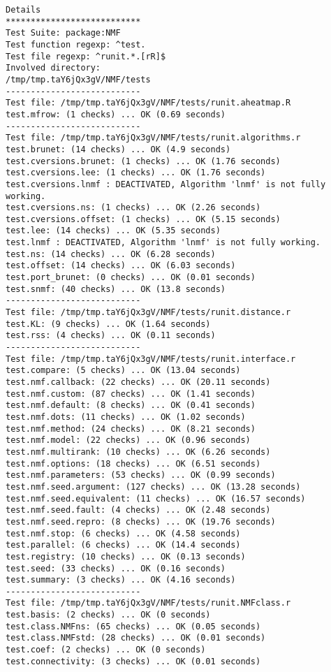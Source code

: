 \documentclass[10pt]{article}
\begin{document}
\begin{verbatim}
Details 
*************************** 
Test Suite: package:NMF 
Test function regexp: ^test. 
Test file regexp: ^runit.*.[rR]$ 
Involved directory: 
/tmp/tmp.taY6jQx3gV/NMF/tests 
--------------------------- 
Test file: /tmp/tmp.taY6jQx3gV/NMF/tests/runit.aheatmap.R 
test.mfrow: (1 checks) ... OK (0.69 seconds)
--------------------------- 
Test file: /tmp/tmp.taY6jQx3gV/NMF/tests/runit.algorithms.r 
test.brunet: (14 checks) ... OK (4.9 seconds)
test.cversions.brunet: (1 checks) ... OK (1.76 seconds)
test.cversions.lee: (1 checks) ... OK (1.76 seconds)
test.cversions.lnmf : DEACTIVATED, Algorithm 'lnmf' is not fully working.
test.cversions.ns: (1 checks) ... OK (2.26 seconds)
test.cversions.offset: (1 checks) ... OK (5.15 seconds)
test.lee: (14 checks) ... OK (5.35 seconds)
test.lnmf : DEACTIVATED, Algorithm 'lnmf' is not fully working.
test.ns: (14 checks) ... OK (6.28 seconds)
test.offset: (14 checks) ... OK (6.03 seconds)
test.port_brunet: (0 checks) ... OK (0.01 seconds)
test.snmf: (40 checks) ... OK (13.8 seconds)
--------------------------- 
Test file: /tmp/tmp.taY6jQx3gV/NMF/tests/runit.distance.r 
test.KL: (9 checks) ... OK (1.64 seconds)
test.rss: (4 checks) ... OK (0.11 seconds)
--------------------------- 
Test file: /tmp/tmp.taY6jQx3gV/NMF/tests/runit.interface.r 
test.compare: (5 checks) ... OK (13.04 seconds)
test.nmf.callback: (22 checks) ... OK (20.11 seconds)
test.nmf.custom: (87 checks) ... OK (1.41 seconds)
test.nmf.default: (8 checks) ... OK (0.41 seconds)
test.nmf.dots: (11 checks) ... OK (1.02 seconds)
test.nmf.method: (24 checks) ... OK (8.21 seconds)
test.nmf.model: (22 checks) ... OK (0.96 seconds)
test.nmf.multirank: (10 checks) ... OK (6.26 seconds)
test.nmf.options: (18 checks) ... OK (6.51 seconds)
test.nmf.parameters: (53 checks) ... OK (0.99 seconds)
test.nmf.seed.argument: (127 checks) ... OK (13.28 seconds)
test.nmf.seed.equivalent: (11 checks) ... OK (16.57 seconds)
test.nmf.seed.fault: (4 checks) ... OK (2.48 seconds)
test.nmf.seed.repro: (8 checks) ... OK (19.76 seconds)
test.nmf.stop: (6 checks) ... OK (4.58 seconds)
test.parallel: (6 checks) ... OK (14.4 seconds)
test.registry: (10 checks) ... OK (0.13 seconds)
test.seed: (33 checks) ... OK (0.16 seconds)
test.summary: (3 checks) ... OK (4.16 seconds)
--------------------------- 
Test file: /tmp/tmp.taY6jQx3gV/NMF/tests/runit.NMFclass.r 
test.basis: (2 checks) ... OK (0 seconds)
test.class.NMFns: (65 checks) ... OK (0.05 seconds)
test.class.NMFstd: (28 checks) ... OK (0.01 seconds)
test.coef: (2 checks) ... OK (0 seconds)
test.connectivity: (3 checks) ... OK (0.01 seconds)

\end{verbatim}
\end{document}
